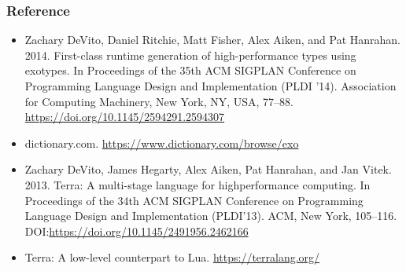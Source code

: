\documentclass{beamer}
\begin{document}
\begin{frame}
	\frametitle{Reference}
  \begin{itemize}
  \item Zachary DeVito, Daniel Ritchie, Matt Fisher, Alex Aiken, and Pat Hanrahan. 2014. First-class runtime generation of high-performance types using exotypes. In Proceedings of the 35th ACM SIGPLAN Conference on Programming Language Design and Implementation (PLDI '14). Association for Computing Machinery, New York, NY, USA, 77–88. \url{https://doi.org/10.1145/2594291.2594307}
  \item dictionary.com. \url{https://www.dictionary.com/browse/exo}
  \item Zachary DeVito, James Hegarty, Alex Aiken, Pat Hanrahan, and Jan Vitek. 2013. Terra: A multi-stage language for highperformance computing. In Proceedings of the 34th ACM SIGPLAN Conference on Programming Language Design and Implementation (PLDI’13). ACM, New York, 105–116. DOI:\url{https://doi.org/10.1145/2491956.2462166}
  \item Terra: A low-level counterpart to Lua. \url{https://terralang.org/}
  \end{itemize}
\end{frame}
\end{document}
